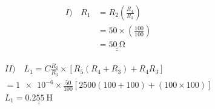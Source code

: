 \documentclass[12pt]{article}
\begin{document}
\begin{align*}
I)\quad	R_1 &= R_2\left(\frac{R_4}{R_3}\right) \\
	    &= 50 \times \left(\frac{100}{100} \right) \\
	    &= \underline{\underline{\qty{50}{\ohm}}}
\end{align*}

\begin{multline*}
II) \quad	L_1 = C\frac{R_2}{R_3}\times\left[R_5(R_4+R_3)+R_4R_3\right] \\
= \num{1e-6}\times\frac{50}{100}\left[2500(100+100)+(100\times100)\right] \\
L_1 = \underline{\underline{\qty{0.255}{\henry}}}
\end{multline*}
	
\end{document}
